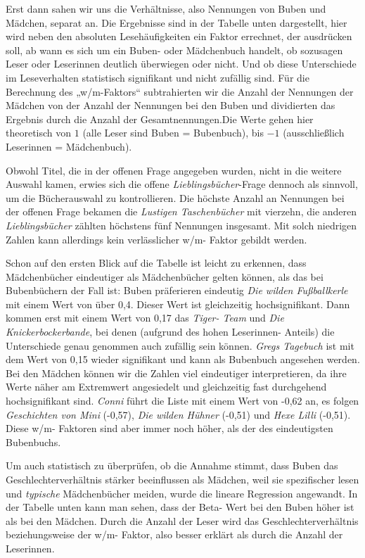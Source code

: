 Erst dann sahen wir uns die Verhältnisse, also Nennungen von Buben und
Mädchen, separat an. Die Ergebnisse sind in der Tabelle unten
dargestellt, hier wird neben den absoluten Lesehäufigkeiten ein Faktor
errechnet, der ausdrücken soll, ab wann es sich um ein Buben- oder
Mädchenbuch handelt, ob sozusagen Leser oder Leserinnen deutlich
überwiegen oder nicht. Und ob diese Unterschiede im Leseverhalten
statistisch signifikant und nicht zufällig sind. Für die Berechnung des
„w/m-Faktors`` subtrahierten wir die Anzahl der Nennungen der Mädchen
von der Anzahl der Nennungen bei den Buben und dividierten das Ergebnis
durch die Anzahl der Gesamtnennungen.Die Werte gehen hier theoretisch
von $1$ (alle Leser sind Buben = Bubenbuch), bis $-1$ (ausschließlich
Leserinnen = Mädchenbuch).



Obwohl Titel, die in der offenen Frage angegeben wurden, nicht in die
weitere Auswahl kamen, erwies sich die offene
\emph{Lieblingsbücher}-Frage dennoch als sinnvoll, um die Bücherauswahl
zu kontrollieren. Die höchste Anzahl an Nennungen bei der offenen Frage
bekamen die \emph{Lustigen Taschenbücher} mit vierzehn, die anderen
\emph{Lieblingsbücher} zählten höchstens fünf Nennungen insgesamt. Mit
solch niedrigen Zahlen kann allerdings kein verlässlicher w/m- Faktor
gebildt werden.

Schon auf den ersten Blick auf die Tabelle ist leicht zu erkennen, dass
Mädchenbücher eindeutiger als Mädchenbücher gelten können, als das bei
Bubenbüchern der Fall ist: Buben präferieren eindeutig \emph{Die wilden
Fußballkerle} mit einem Wert von über 0,4. Dieser Wert ist gleichzeitig
hochsignifikant. Dann kommen erst mit einem Wert von 0,17 das
\emph{Tiger- Team} und \emph{Die Knickerbockerbande}, bei denen
(aufgrund des hohen Leserinnen- Anteils) die Unterschiede genau genommen
auch zufällig sein können. \emph{Gregs Tagebuch} ist mit dem Wert von
0,15 wieder signifikant und kann als Bubenbuch angesehen werden. Bei den
Mädchen können wir die Zahlen viel eindeutiger interpretieren, da ihre
Werte näher am Extremwert angesiedelt und gleichzeitig fast durchgehend
hochsignifikant sind. \emph{Conni} führt die Liste mit einem Wert von
-0,62 an, es folgen \emph{Geschichten von Mini} (-0,57), \emph{Die
wilden Hühner} (-0,51) und \emph{Hexe Lilli} (-0,51). Diese w/m-
Faktoren sind aber immer noch höher, als der des eindeutigsten
Bubenbuchs.

Um auch statistisch zu überprüfen, ob die Annahme stimmt, dass Buben das
Geschlechterverhältnis stärker beeinflussen als Mädchen, weil sie
spezifischer lesen und \emph{typische} Mädchenbücher meiden, wurde die
lineare Regression angewandt. In der Tabelle unten kann man sehen, dass
der Beta- Wert bei den Buben höher ist als bei den Mädchen. Durch die
Anzahl der Leser wird das Geschlechterverhältnis beziehungsweise der
w/m- Faktor, also besser erklärt als durch die Anzahl der Leserinnen.

